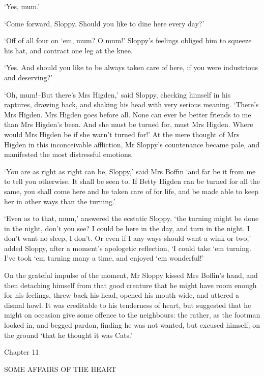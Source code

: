 ‘Yes, mum.’

‘Come forward, Sloppy. Should you like to dine here every day?’

‘Off of all four on ‘em, mum? O mum!’ Sloppy’s feelings obliged him to
squeeze his hat, and contract one leg at the knee.

‘Yes. And should you like to be always taken care of here, if you were
industrious and deserving?’

‘Oh, mum!--But there’s Mrs Higden,’ said Sloppy, checking himself in his
raptures, drawing back, and shaking his head with very serious meaning.
‘There’s Mrs Higden. Mrs Higden goes before all. None can ever be better
friends to me than Mrs Higden’s been. And she must be turned for, must
Mrs Higden. Where would Mrs Higden be if she warn’t turned for!’ At the
mere thought of Mrs Higden in this inconceivable affliction, Mr Sloppy’s
countenance became pale, and manifested the most distressful emotions.

‘You are as right as right can be, Sloppy,’ said Mrs Boffin ‘and far be
it from me to tell you otherwise. It shall be seen to. If Betty Higden
can be turned for all the same, you shall come here and be taken care of
for life, and be made able to keep her in other ways than the turning.’

‘Even as to that, mum,’ answered the ecstatic Sloppy, ‘the turning might
be done in the night, don’t you see? I could be here in the day, and
turn in the night. I don’t want no sleep, I don’t. Or even if I any ways
should want a wink or two,’ added Sloppy, after a moment’s apologetic
reflection, ‘I could take ‘em turning. I’ve took ‘em turning many a
time, and enjoyed ‘em wonderful!’

On the grateful impulse of the moment, Mr Sloppy kissed Mrs Boffin’s
hand, and then detaching himself from that good creature that he might
have room enough for his feelings, threw back his head, opened his mouth
wide, and uttered a dismal howl. It was creditable to his tenderness of
heart, but suggested that he might on occasion give some offence to the
neighbours: the rather, as the footman looked in, and begged pardon,
finding he was not wanted, but excused himself; on the ground ‘that he
thought it was Cats.’



Chapter 11

SOME AFFAIRS OF THE HEART


